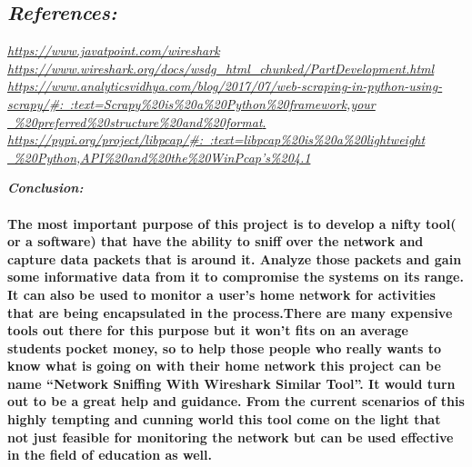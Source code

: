\documentclass[a4paper,12pt]{report}
\begin{document}
\subsection{\emph{References:}}
\begin{flushleft}
\href{https://www.javatpoint.com/wireshark}{\emph{https://www.javatpoint.com/wireshark}}
\bigbreak
\href{https://www.wireshark.org/docs/wsdg_html_chunked/PartDevelopment.html}{\emph{https://www.wireshark.org/docs/wsdg\_html\_chunked/PartDevelopment.html}}
\bigbreak
\href{https://www.analyticsvidhya.com/blog/2017/07/web-scraping-in-python-using-scrapy/\#:~:text=Scrapy\%20is\%20a\%20Python\%20framework,your\%20preferred\%20structure\%20and\%20format}{\emph{https://www.analyticsvidhya.com/blog/2017/07/web-scraping-in-python-using-scrapy/\#:~:text=Scrapy\%20is\%20a\%20Python\%20framework,your \ \%20preferred\%20structure\%20and\%20format}.}
\bigbreak
\href{https://pypi.org/project/libpcap/\#:~:text=libpcap\%20is\%20a\%20lightweight\%20Python,API\%20and\%20the\%20WinPcap's\%204.1}{\emph{https://pypi.org/project/libpcap/\#:~:text=libpcap\%20is\%20a\%20lightweight \ \%20Python,API\%20and\%20the\%20WinPcap's\%204.1}}
\end{flushleft}
\newpage

\begin{flushleft}

\textbf{\LARGE \bf \emph{Conclusion:}}
\end{flushleft}
\paragraph{The most important purpose of this project is to develop a nifty tool(
or a software) that have the ability to sniff over the network and
capture data packets that is around it. Analyze those packets and gain
some informative data from it to compromise the systems on its range. It
can also be used to monitor a user's home network for activities that
are being encapsulated in the process.There are many expensive tools out
there for this purpose but it won't fits on an average students pocket
money, so to help those people who really wants to know what is going on
with their home network this project can be name ``Network Sniffing With
Wireshark Similar Tool''. It would turn out to be a great help and
guidance. From the current scenarios of this highly tempting and cunning
world this tool come on the light that not just feasible for monitoring
the network but can be used effective in the field of education as well.}
\end{document}
